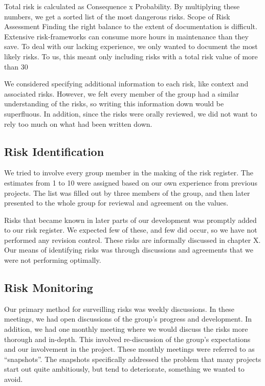 Total risk is calculated as Consequence x Probability. By multiplying
these numbers, we get a sorted list of the most dangerous risks. 
Scope of Risk Assessment
Finding the right balance to the extent of documentation is difficult.
Extensive risk-frameworks can consume more hours in maintenance than
they save. To deal with our lacking experience, we only wanted to
document the most likely risks. To us, this meant only including risks
with a total risk value of more than 30

We considered specifying additional information to each risk, like
context and associated risks. However, we felt every member of the
group had a similar understanding of the risks, so writing this
information down would be superfluous. In addition, since the risks
were orally reviewed, we did not want to rely too much on what had been
written down.

\subsection{Risk Identification}
We tried to involve every group member in the making of the risk
register. The estimates from 1 to 10 were assigned based on our own
experience from previous projects. The list was filled out by three
members of the group, and then later presented to the whole group for
reviewal and agreement on the values. 

Risks that became known in later parts of our development was promptly
added to our risk register. We expected few of these, and few did
occur, so we have not performed any revision control. These risks are
informally discussed in chapter X. Our means of identifying
risks was through discussions and agreements that we were not
performing optimally.

\subsection{Risk Monitoring}
Our primary method for surveilling risks was weekly discussions. In
these meetings, we had open discussions of the group's
progress and development. In addition, we had one monthly meeting where
we would discuss the risks more thorough and in-depth. This involved
re-discussion of the group's expectations and our
involvement in the project. These monthly meetings were referred to as
``snapshots''. The snapshots
specifically addressed the problem that many projects start out quite
ambitiously, but tend to deteriorate, something we wanted to avoid.

